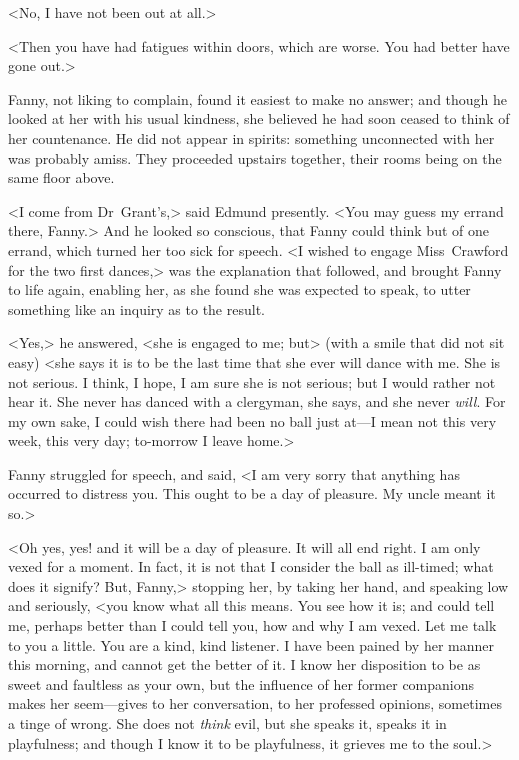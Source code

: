 <No, I have not been out at all.>

<Then you have had fatigues within doors, which are worse. You had better have gone out.>

Fanny, not liking to complain, found it easiest to make no answer; and though he looked at her with his usual kindness, she believed he had soon ceased to think of her countenance. He did not appear in spirits: something unconnected with her was probably amiss. They proceeded upstairs together, their rooms being on the same floor above.

<I come from Dr~Grant's,> said Edmund presently. <You may guess my errand there, Fanny.> And he looked so conscious, that Fanny could think but of one errand, which turned her too sick for speech. <I wished to engage Miss~Crawford for the two first dances,> was the explanation that followed, and brought Fanny to life again, enabling her, as she found she was expected to speak, to utter something like an inquiry as to the result.

<Yes,> he answered, <she is engaged to me; but> (with a smile that did not sit easy) <she says it is to be the last time that she ever will dance with me. She is not serious. I think, I hope, I am sure she is not serious; but I would rather not hear it. She never has danced with a clergyman, she says, and she never \textit{will}. For my own sake, I could wish there had been no ball just at—I mean not this very week, this very day; to-morrow I leave home.>

Fanny struggled for speech, and said, <I am very sorry that anything has occurred to distress you. This ought to be a day of pleasure. My uncle meant it so.>

<Oh yes, yes! and it will be a day of pleasure. It will all end right. I am only vexed for a moment. In fact, it is not that I consider the ball as ill-timed; what does it signify? But, Fanny,> stopping her, by taking her hand, and speaking low and seriously, <you know what all this means. You see how it is; and could tell me, perhaps better than I could tell you, how and why I am vexed. Let me talk to you a little. You are a kind, kind listener. I have been pained by her manner this morning, and cannot get the better of it. I know her disposition to be as sweet and faultless as your own, but the influence of her former companions makes her seem—gives to her conversation, to her professed opinions, sometimes a tinge of wrong. She does not \textit{think}  evil, but she speaks it, speaks it in playfulness; and though I know it to be playfulness, it grieves me to the soul.>

